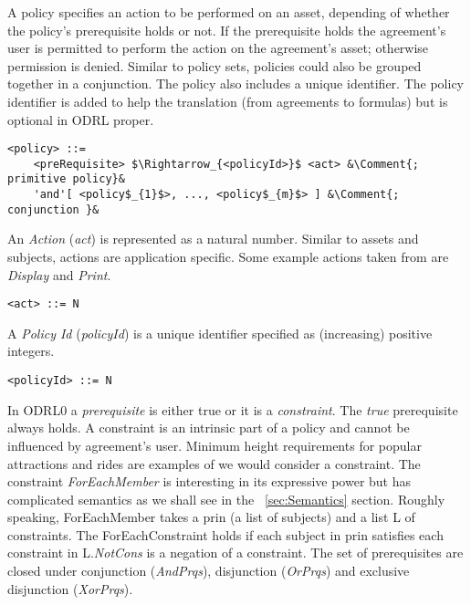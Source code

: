 A policy specifies an action to be performed on an asset, depending of whether the policy's prerequisite holds or not. If the prerequisite holds the agreement's user is permitted to perform the action on the agreement's asset; otherwise permission is denied. Similar to policy sets, policies could also be grouped together in a conjunction. The policy also includes a unique identifier. The policy identifier is added to help the translation (from agreements to formulas) but is optional in ODRL proper.


\lstset{mathescape, language=AST, escapechar=\&}  
\begin{lstlisting}[frame=single, caption={policy},label={lst:policyast}]
<policy> ::=  
	<preRequisite> $\Rightarrow_{<policyId>}$ <act> &\Comment{; primitive policy}&
	'and'[ <policy$_{1}$>, ..., <policy$_{m}$> ] &\Comment{; conjunction }&
\end{lstlisting}

An \emph{Action} (\emph{act}) is represented as a natural number. Similar to assets and subjects, actions are application specific. Some example actions taken from \cite{pucella2006} are \emph{Display} and \emph{Print}.

\lstset{mathescape, language=AST}  
\begin{lstlisting}[frame=single, caption={act},label={lst:actast}]
<act> ::= N
\end{lstlisting}

A \emph{Policy Id} (\emph{policyId}) is a unique identifier specified as (increasing) positive integers. 

\lstset{mathescape, language=AST}  
\begin{lstlisting}[frame=single, caption={policyId},label={lst:policyIdast}]
<policyId> ::= N
\end{lstlisting}

In ODRL0 a \emph{prerequisite} is either true or it is a \emph{constraint}. The \emph{true} prerequisite always holds. A constraint is an intrinsic part of a policy and cannot be influenced by agreement's user. Minimum height requirements for popular attractions and rides are examples of we would consider a constraint. The constraint \emph{ForEachMember} is interesting in its expressive power but has complicated semantics as we shall see in the ~\ref{sec:Semantics} section. Roughly speaking, ForEachMember takes a prin (a list of subjects) and a list L of constraints. The ForEachConstraint holds if each subject in prin satisfies each constraint in L.\emph{NotCons} is a negation of a constraint. The set of prerequisites are closed under conjunction (\emph{AndPrqs}), disjunction (\emph{OrPrqs}) and exclusive disjunction (\emph{XorPrqs}).


